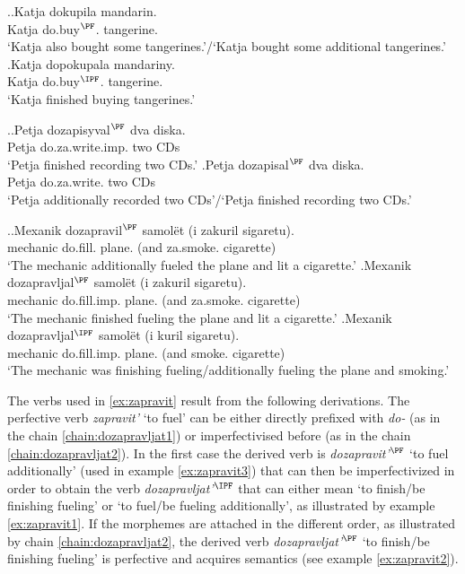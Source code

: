 \ex.\ag.\label{ex:do:kupit}Katja dokupila mandarin.\\
Katja do.buy$^{\PF}$. tangerine.\\
\trans `Katja also bought some tangerines.'/`Katja bought some additional tangerines.'
\bg.\label{ex:do:pokupat}Katja dopokupala mandariny.\\
Katja do.buy$^{\IPF}$. tangerine.\\
\trans `Katja finished buying tangerines.'

\ex.\ag.\label{ex:do:zapisyvat}Petja dozapisyval$^{\PF}$ dva diska.\\
Petja do.za.write.imp. two CDs\\
\trans `Petja finished recording two CDs.'
\bg.\label{ex:do:zapisat}Petja dozapisal$^{\PF}$ dva diska.\\
Petja do.za.write. two CDs\\
\trans `Petja additionally recorded two CDs'/`Petja finished recording two CDs.'

\ex.\label{ex:zapravit}\ag.\label{ex:zapravit3}Mexanik dozapravil$^{\PF}$ samol\"et (i zakuril sigaretu).\\
mechanic do.fill. plane. (and za.smoke. cigarette)\\
\trans `The mechanic additionally fueled the plane and lit a cigarette.'
\bg.\label{ex:zapravit2}Mexanik dozapravljal$^{\PF}$ samol\"et (i zakuril sigaretu).\\
mechanic do.fill.imp. plane. (and za.smoke. cigarette)\\
\trans `The mechanic finished fueling the plane and lit a cigarette.'
\bg.\label{ex:zapravit1}Mexanik dozapravljal$^{\IPF}$ samol\"et (i kuril sigaretu).\\
mechanic do.fill.imp. plane. (and smoke. cigarette)\\
\trans `The mechanic was finishing fueling/additionally fueling the plane and smoking.'

The verbs used in \ref{ex:zapravit} result from the following derivations. The perfective verb \textit{zapravit'} `to fuel' can be either directly prefixed with \textit{do-} (as in the chain \ref{chain:dozapravljat1}) or imperfectivised before (as in the chain \ref{chain:dozapravljat2}). In the first case the derived verb is \textit{dozapravit'}$^{\PF}$ `to fuel additionally' (used in example \ref{ex:zapravit3}) that can then be imperfectivized in order to obtain the verb \textit{dozapravljat'}$^{\IPF}$ that can either mean `to finish/be finishing fueling' or `to fuel/be fueling additionally', as illustrated by example \ref{ex:zapravit1}. If the morphemes are attached in the different order, as illustrated by chain \ref{chain:dozapravljat2}, the derived verb \textit{dozapravljat'}$^{\PF}$ `to finish/be finishing fueling' is perfective and acquires  semantics (see example \ref{ex:zapravit2}).

